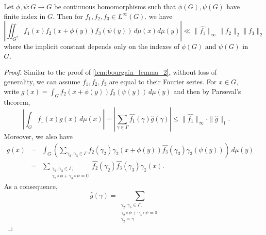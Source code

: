 \begin{lemma} \label{lem:counting2}
 Let $\phi, \psi: G \rightarrow G$ be continuous homomorphisms such that $\phi(G), \psi(G)$ have finite index in $G$. Then for $f_1, f_2, f_3 \in L^\infty(G)$, we have
\begin{equation} 
\left| \iint_{G^2} f_1(x) f_2(x+ \phi(y))f_3(\psi(y)) \, d\mu(x) d\mu(y) \right| \ll \| \widehat{f_1} \|_{\infty} \|f_2 \|_2 \| f_3\|_2 
\end{equation}
where the implicit constant depends only on the indexes of $\phi(G)$ and $\psi(G)$ in $G$.
\end{lemma}
\begin{proof}

Similar to the proof of \cref{lem:bourgain_lemma_2}, without loss of generality, we can assume $f_1, f_2, f_3$ are equal to their Fourier series. For $x \in G$, write $g(x) = \int_{G} f_2(x+ \phi(y) )f_3(\psi(y) ) \, d\mu(y)$ and then by Parseval's theorem,
\begin{equation*} %
\left| \int_G f_1(x) g(x) \, d \mu(x) \right|= \left| \sum_{\gamma \in \Gamma} \widehat{f_1}(\gamma) \widehat{g} (\overline{\gamma}) \right| \leq \| \widehat{f_1} \|_{\infty} \cdot \| \widehat{g} \|_{1}.
\end{equation*} 
Moreover, we also have
\begin{eqnarray*}
g(x) %
&=& \int_G \left( \sum_{\gamma_2, \gamma_3 \in \Gamma} \widehat{f_2}(\gamma_2) \gamma_2(x+ \phi(y)) \widehat{f_3}(\gamma_3) \gamma_3(\psi(y)) \right) \, d\mu(y) \nonumber \\
&=&  \sum_{\substack{ \gamma_2, \gamma_3 \in \Gamma,\\ \gamma_2 \circ \phi + \gamma_3 \circ \psi = 0}} \widehat{f_2}(\gamma_2) \widehat{f_3}(\gamma_3) \gamma_2(x). %
\end{eqnarray*}
As a consequence,
\begin{equation*} %
\widehat{g}(\gamma) = \sum_{\substack{ \gamma_2, \gamma_3 \in \Gamma,\\ \gamma_2 \circ \phi + \gamma_3 \circ \psi = 0, \\ \gamma_2 = \gamma}} 

\end{equation*}
\end{proof}
